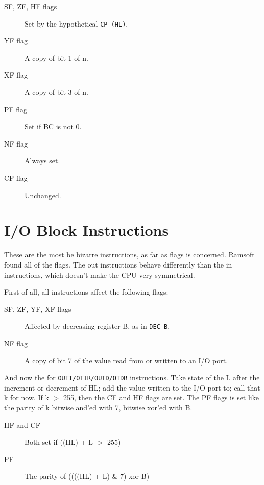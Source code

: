 \documentclass[oneside,a4paper]{book}
\begin{document}
\begin{description}

\item[SF, ZF, HF flags]
  Set by the hypothetical {\tt CP (HL)}.

\item[YF flag]
  A copy of bit 1 of n.

\item[XF flag]
  A copy of bit 3 of n.

\item[PF flag]
  Set if BC is not 0.

\item[NF flag]
  Always set.

\item[CF flag]
  Unchanged.

\end{description}


\section{I/O Block Instructions}
\label{block_io}

These are the most be bizarre instructions, as far as flags is concerned. 
Ramsoft found all of the flags. The out instructions behave differently 
than the in instructions, which doesn't make the CPU very symmetrical. 

First of all, all instructions affect the following flags:

\begin{description}

\item[SF, ZF, YF, XF flags]
  Affected by decreasing register B, as in {\tt DEC B}.

\item[NF flag]
  A copy of bit 7 of the value read from or written to an I/O port.

\end{description}

And now the for {\tt OUTI/OTIR/OUTD/OTDR} instructions. Take state of the
L after the increment or decrement of HL; add the value written to the I/O 
port to; call that k for now. If k $>$ 255, then the CF and HF flags are set. 
The PF flags is set like the parity of k bitwise and'ed with 7, bitwise 
xor'ed with B.

\begin{description}

\item[HF and CF]
  Both set if ((HL) + L  $>$ 255)

\item[PF]
  The parity of ((((HL) + L) \& 7) xor B)

\end{description}
\end{document}
